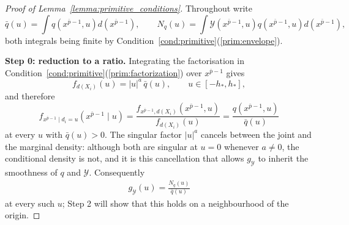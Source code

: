 \documentclass{article}
\begin{document}
\begin{appendices}
\begin{proof}[Proof of Lemma~\ref{lemma:primitive_conditions}]
 
Throughout write
\[
    \bar q(u)=\int q\!\left(x^{\bar p-1},u\right)d\!\left(x^{\bar p-1}\right),
    \qquad
    N_q(u)=\int \mathcal{Y}\!\left(x^{\bar p-1},u\right)
      q\!\left(x^{\bar p-1},u\right)d\!\left(x^{\bar p-1}\right),
\]
both integrals being finite by
Condition~\ref{cond:primitive}(\ref{prim:envelope}).
 
\textbf{Step 0: reduction to a ratio.}
Integrating the factorisation in
Condition~\ref{cond:primitive}(\ref{prim:factorization}) over $x^{\bar p-1}$
gives
\[
    f_{d(X_i)}(u)=|u|^{a}\,\bar q(u),\qquad u\in[-h_{*},h_{*}],
\]
and therefore
\[
    f_{x^{\bar p-1}\mid d_i=u}\!\left(x^{\bar p-1}\mid u\right)
    =\frac{f_{x^{\bar p-1},d(X_i)}\left(x^{\bar p-1},u\right)}{f_{d(X_i)}(u)}
    =\frac{q\!\left(x^{\bar p-1},u\right)}{\bar q(u)}
\]
at every $u$ with $\bar q(u)>0$. The singular factor $|u|^{a}$ cancels between
the joint and the marginal density: although both are singular at $u=0$
whenever $a\ne0$, the conditional density is not, and it is this cancellation
that allows $g_{\mathcal{Y}}$ to inherit the smoothness of $q$ and
$\mathcal{Y}$. Consequently
\begin{align}\label{eq:g_ratio}
    g_{\mathcal{Y}}(u)=\frac{N_q(u)}{\bar q(u)}
\end{align}
at every such $u$; Step 2 will show that this holds on a neighbourhood of the
origin.
 

\end{proof}
\end{appendices}
\end{document}
